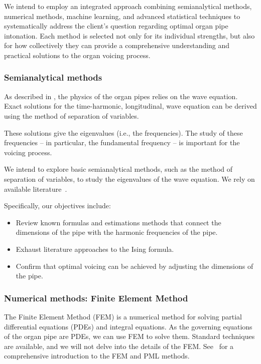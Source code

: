 \documentclass{psu-plan}
\begin{document}
We intend to employ an integrated approach combining semianalytical methods, numerical methods, machine learning, 
and advanced statistical techniques to systematically address the client's question regarding optimal organ 
pipe intonation.
Each method is selected not only for its individual strengths, but also for how collectively they can provide 
a comprehensive understanding and practical solutions to the organ voicing process.

\subsubsection{Semianalytical methods}

As described in \autocite{2004RosFle-1}, the physics of the organ pipes relies
on the wave equation.
Exact solutions for the time-harmonic, longitudinal, wave equation can be
derived using the method of separation of variables.

These solutions give the eigenvalues (i.e., the frequencies). 
The study of these frequencies -- in particular, the fundamental
frequency -- is important for the voicing process.

We intend to explore basic semianalytical methods, such as the method of
separation of variables, to study the eigenvalues of the wave equation.
We rely on available literature~\autocite{2004RosFle-1, 2012RosFle-1}.

Specifically, our objectives include:
\begin{itemize}
    \item Review known formulas and estimations methods that connect the
        dimensions of the pipe with the harmonic frequencies of the pipe.
 \item Exhaust literature approaches to the Ising formula.
 \item Confirm that optimal voicing can be achieved by adjusting the
        dimensions of the pipe.
\end{itemize}

\subsubsection{Numerical methods: Finite Element Method}

The Finite Element Method (FEM) is a numerical method for solving partial
differential equations (PDEs) and integral equations.
As the governing equations of the organ pipe are PDEs, we can use FEM to solve
them.
Standard techniques are available, and we will not delve into the details of the
FEM.
See~\autocite{2021ErnGue-1, 2021ErnGue-2, 2019VazKeeDem-1} for a
comprehensive introduction to the FEM and PML methods.
\end{document}
